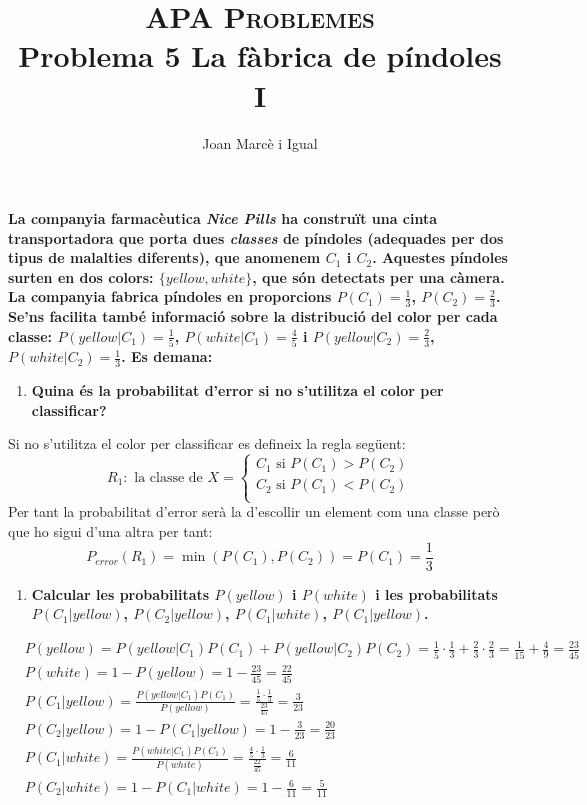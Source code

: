 \documentclass[a4paper]{article}
\title{\textsc{APA Problemes} \\ Problema 5 La fàbrica de píndoles I}
\author{Joan Marcè i Igual}
\date{}
\begin{document}
\maketitle

\textbf{La companyia farmacèutica \emph{Nice Pills} ha construït una cinta transportadora que porta dues \emph{classes} de píndoles (adequades per dos tipus de malalties diferents), que anomenem $C_1$ i $C_2$. Aquestes píndoles surten en dos colors: $\{yellow, white\}$, que són detectats per una càmera. La companyia fabrica píndoles en proporcions $P(C_1) = \frac{1}{3}$, $P(C_2) = \frac{2}{3}$. Se'ns facilita també informació sobre la distribució del color per cada classe: $P(yellow|C_1) = \frac{1}{5}$, $P(white|C_1) = \frac{4}{5}$ i $P(yellow|C_2)=\frac{2}{3}$, $P(white|C_2)=\frac{1}{3}$. Es demana:}


\begin{enumerate}
	\item \textbf{Quina és la probabilitat d'error si no s'utilitza el color per classificar?}
\end{enumerate}
Si no s'utilitza el color per classificar es defineix la regla següent:
$$
R_1: \text{ la classe de } X = 
\begin{cases}
C_1 \text{ si } P(C_1) > P(C_2) \\
C_2 \text{ si } P(C_1) < P(C_2) \\
\end{cases}
$$
Per tant la probabilitat d'error serà la d'escollir un element com una classe però que ho sigui d'una altra per tant:
$$
P_{error}(R_1) = \min(P(C_1),P(C_2)) = P(C_1) = \boxed{\frac{1}{3}}
$$

\begin{enumerate}[resume]
	\item \textbf{Calcular les probabilitats $P(yellow)$ i $P(white)$ i les probabilitats $P(C_1|yellow)$, $P(C_2|yellow)$, $P(C_1|white)$, $P(C_1|yellow)$.}
\end{enumerate}
\begin{align*}
& P(yellow) = P(yellow|C_1)P(C_1) + P(yellow|C_2)P(C_2) = 
\frac{1}{5}·\frac{1}{3} + \frac{2}{3}·\frac{2}{3} = 
\frac{1}{15} + \frac{4}{9} = \boxed{\frac{23}{45}} \\
& P(white) = 1 - P(yellow) = 1 - \frac{23}{45} = 
\boxed{\frac{22}{45}} \\
& P(C_1|yellow) = \frac{P(yellow|C_1)P(C_1)}{P(yellow)} = 
\frac{\frac{1}{5}·\frac{1}{3}}{\frac{23}{45}} = \boxed{\frac{3}{23}} \\
& P(C_2|yellow) = 1 - P(C_1|yellow) = 1 - \frac{3}{23} = 
\boxed{\frac{20}{23}} \\
& P(C_1|white) = \frac{P(white|C_1)P(C_1)}{P(white)} =
\frac{\frac{4}{5}·\frac{1}{3}}{\frac{22}{45}} =
\boxed{\frac{6}{11}} \\
& P(C_2|white) = 1 - P(C_1|white) = 1 - \frac{6}{11} =
\boxed{\frac{5}{11}}
\end{align*}
\end{document}
